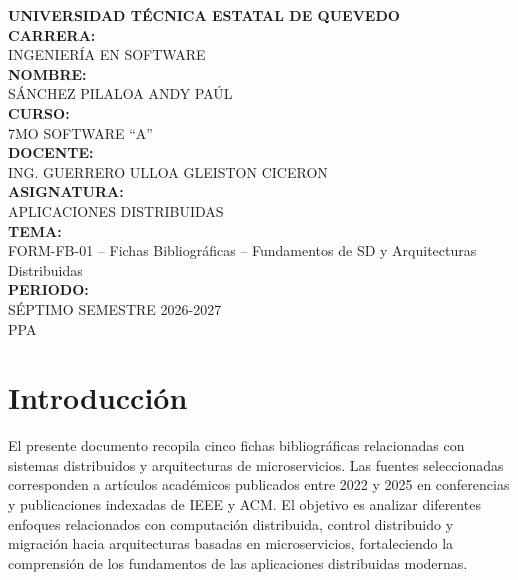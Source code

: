 \documentclass[12pt]{article}
\begin{document}
\begin{titlepage}

\centering

{\Large \textbf{UNIVERSIDAD TÉCNICA ESTATAL DE QUEVEDO}}\\[0.3cm]

\textbf

{\large \textbf{CARRERA:}}\\[0.2cm]
INGENIERÍA EN SOFTWARE\\[1cm]

{\large \textbf{NOMBRE:}}\\[0.2cm]
SÁNCHEZ PILALOA ANDY PAÚL\\[1cm]

{\large \textbf{CURSO:}}\\[0.2cm]
7MO SOFTWARE ``A''\\[1cm]

{\large \textbf{DOCENTE:}}\\[0.2cm]
ING. GUERRERO ULLOA GLEISTON CICERON\\[1cm]

{\large \textbf{ASIGNATURA:}}\\[0.2cm]
APLICACIONES DISTRIBUIDAS\\[1cm]

{\large \textbf{TEMA:}}\\[0.2cm]
FORM-FB-01 -- Fichas Bibliográficas -- Fundamentos de SD y Arquitecturas Distribuidas\\[1cm]

{\large \textbf{PERIODO:}}\\[0.2cm]
SÉPTIMO SEMESTRE 2026-2027\\
PPA

\vfill

\end{titlepage}

\newpage

\tableofcontents
\thispagestyle{empty}

\newpage

\section{Introducción}

El presente documento recopila cinco fichas bibliográficas relacionadas con sistemas distribuidos y arquitecturas de microservicios. Las fuentes seleccionadas corresponden a artículos académicos publicados entre 2022 y 2025 en conferencias y publicaciones indexadas de IEEE y ACM. El objetivo es analizar diferentes enfoques relacionados con computación distribuida, control distribuido y migración hacia arquitecturas basadas en microservicios, fortaleciendo la comprensión de los fundamentos de las aplicaciones distribuidas modernas.
\end{document}
